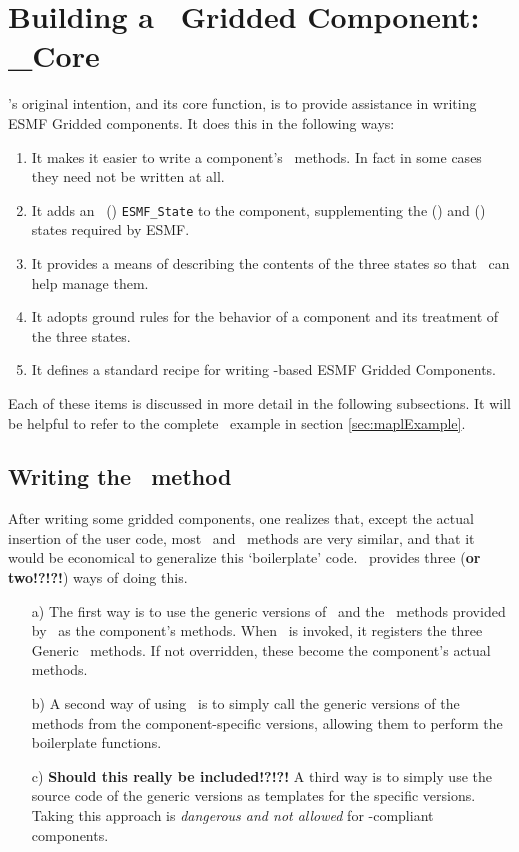 \section{Building a \ggn\ Gridded Component: \ggn\_Core}

\ggn's original intention, and its core function, is
to provide assistance in writing ESMF Gridded components. It does this
in the following ways:
%
\begin{enumerate} 
%
\item It makes it easier to write a component's \IRF\ methods. In fact
  in some cases they need not be written at all.

\item It adds an \gin\ (\gIN ) \texttt{ESMF\_State}
  to the component, supplementing the \im (\IM ) and \ex (\EX )
  states required by ESMF.

\item It provides a means of describing the contents of the three states
   so that \ggn\  can help manage them.
   
\item It adopts ground rules for the behavior of a component 
  and its treatment of the three states.

\item It defines a standard recipe for writing 
 \ggn -based ESMF Gridded Components.
 
\end{enumerate} 
Each of these items is discussed in more detail in the following subsections.
It will be helpful to refer to the complete \ggn\ example in section
\ref{sec:maplExample}.

\subsection{Writing the \IRF\ method} 
After writing some gridded components, one realizes that, except
the actual insertion of the user code, most \ssv\ and \IRF\
methods are very similar, and that it would be economical to
generalize this `boilerplate' code. \ggn\ provides
three (\textbf{or two!?!?!}) ways of doing this.
%
\begin{enumerate}
\item[a)] The first way is to use the generic versions of 
  \ssv\  and the \IRF\ methods provided by \ggn\ as the 
  component's methods. When \gssv\  is
  invoked, it registers the three Generic \IRF\ methods. If not overridden,
  these become the component's actual methods.
  
\item[b)] A second way of using \ggn\  is to simply call the generic
  versions of the methods from the component-specific versions, allowing
  them to perform the boilerplate functions. 
  
\item[c)] \textbf{Should this really be included!?!?!}
  A third way is to simply use the source code
  of the generic versions as templates for the specific versions.
  Taking this approach is \emph{dangerous and not allowed} for \ggn-compliant
  components. 

\end{enumerate}

